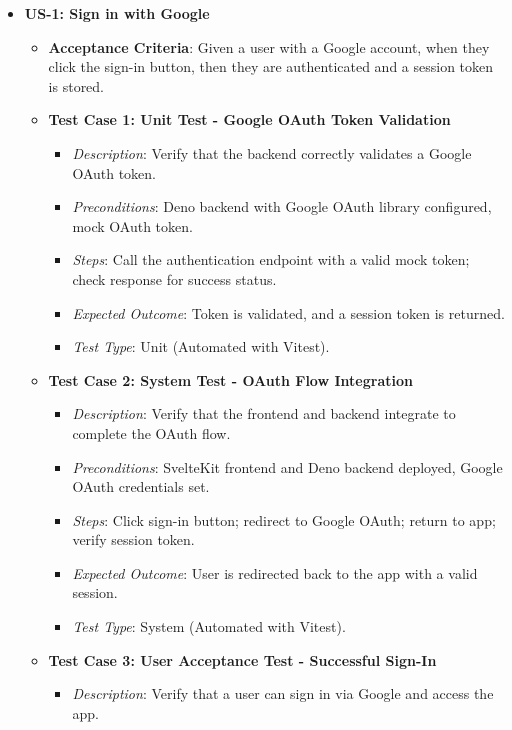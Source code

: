 \documentclass[12pt]{article}
\begin{document}
\begin{itemize}
  \item \textbf{US-1: Sign in with Google}
    \begin{itemize}
      \item \textbf{Acceptance Criteria}: Given a user with a Google account, when they click the sign-in button, then they are authenticated and a session token is stored.
      \item \textbf{Test Case 1: Unit Test - Google OAuth Token Validation}
        \begin{itemize}
          \item \textit{Description}: Verify that the backend correctly validates a Google OAuth token.
          \item \textit{Preconditions}: Deno backend with Google OAuth library configured, mock OAuth token.
          \item \textit{Steps}: Call the authentication endpoint with a valid mock token; check response for success status.
          \item \textit{Expected Outcome}: Token is validated, and a session token is returned.
          \item \textit{Test Type}: Unit (Automated with Vitest).
        \end{itemize}
      \item \textbf{Test Case 2: System Test - OAuth Flow Integration}
        \begin{itemize}
          \item \textit{Description}: Verify that the frontend and backend integrate to complete the OAuth flow.
          \item \textit{Preconditions}: SvelteKit frontend and Deno backend deployed, Google OAuth credentials set.
          \item \textit{Steps}: Click sign-in button; redirect to Google OAuth; return to app; verify session token.
          \item \textit{Expected Outcome}: User is redirected back to the app with a valid session.
          \item \textit{Test Type}: System (Automated with Vitest).
        \end{itemize}
      \item \textbf{Test Case 3: User Acceptance Test - Successful Sign-In}
        \begin{itemize}
          \item \textit{Description}: Verify that a user can sign in via Google and access the app.

\end{itemize}
\end{itemize}
\end{itemize}
\end{document}
